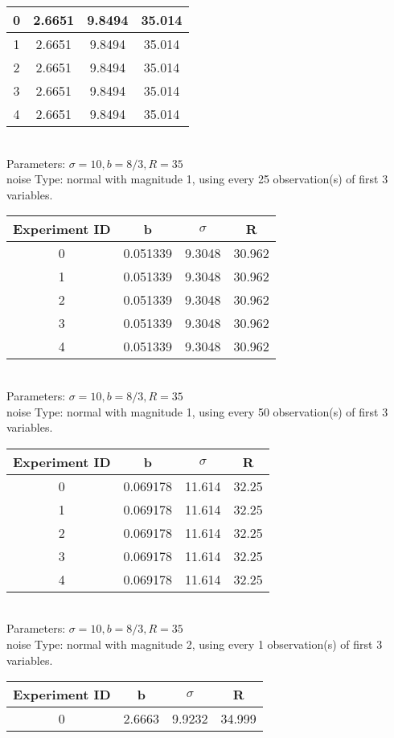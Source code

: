 \begin{multicols}{3}
\begin{tabular}{cccc}
0 & 2.6651 & 9.8494 & 35.014\\ \hline 
 1 & 2.6651 & 9.8494 & 35.014\\ \hline 
 2 & 2.6651 & 9.8494 & 35.014\\ \hline 
 3 & 2.6651 & 9.8494 & 35.014\\ \hline 
 4 & 2.6651 & 9.8494 & 35.014\\ \hline 
 \end{tabular}\\
Parameters: $\sigma=10, b=8/3, R=35$\\
noise Type: normal with magnitude 1, using every 25 observation(s) of first 3 variables.\\
\begin{tabular}{cccc}
\hline Experiment ID & b & $\sigma$ & R \\ \hline 
0 & 0.051339 & 9.3048 & 30.962\\ \hline 
 1 & 0.051339 & 9.3048 & 30.962\\ \hline 
 2 & 0.051339 & 9.3048 & 30.962\\ \hline 
 3 & 0.051339 & 9.3048 & 30.962\\ \hline 
 4 & 0.051339 & 9.3048 & 30.962\\ \hline 
 \end{tabular}\\
Parameters: $\sigma=10, b=8/3, R=35$\\
noise Type: normal with magnitude 1, using every 50 observation(s) of first 3 variables.\\
\begin{tabular}{cccc}
\hline Experiment ID & b & $\sigma$ & R \\ \hline 
0 & 0.069178 & 11.614 & 32.25\\ \hline 
 1 & 0.069178 & 11.614 & 32.25\\ \hline 
 2 & 0.069178 & 11.614 & 32.25\\ \hline 
 3 & 0.069178 & 11.614 & 32.25\\ \hline 
 4 & 0.069178 & 11.614 & 32.25\\ \hline 
 \end{tabular}\\
Parameters: $\sigma=10, b=8/3, R=35$\\
noise Type: normal with magnitude 2, using every 1 observation(s) of first 3 variables.\\
\begin{tabular}{cccc}
\hline Experiment ID & b & $\sigma$ & R \\ \hline 
0 & 2.6663 & 9.9232 & 34.999\\ \hline 

\end{tabular}
\end{multicols}
